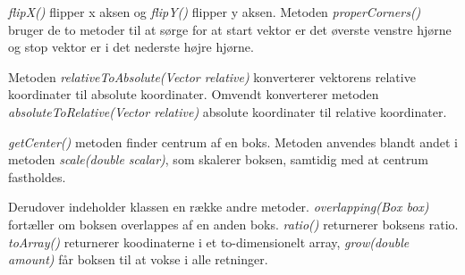 
\emph{flipX()} flipper x aksen og \emph{flipY()} flipper y aksen. Metoden \emph{properCorners()} bruger de to metoder til at sørge for at start vektor er det øverste venstre hjørne og stop vektor er i det nederste højre hjørne.


Metoden \emph{relativeToAbsolute(Vector relative)} konverterer vektorens relative koordinater til absolute koordinater. Omvendt konverterer metoden \emph{absoluteToRelative(Vector relative)} absolute koordinater til relative koordinater.


\emph{getCenter()} metoden finder centrum af en boks. Metoden anvendes blandt andet i metoden \emph{scale(double scalar)}, som skalerer boksen, samtidig med at centrum fastholdes.

Derudover indeholder klassen en række andre metoder. \emph{overlapping(Box box)} fortæller om boksen overlappes af en anden boks. \emph{ratio()} returnerer boksens ratio. \emph{toArray()} returnerer koodinaterne i et to-dimensionelt array, \emph{grow(double amount)} får boksen til at vokse i alle retninger.

